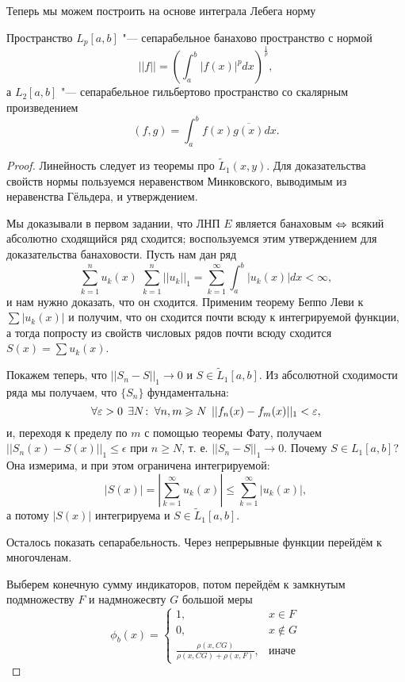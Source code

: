 \documentclass[main]{subfiles}
\begin{document}
Теперь мы можем построить на основе интеграла Лебега
норму 

\begin{theorem} %
  Пространство $L_p[a, b]$ "--- сепарабельное
  банахово пространство с нормой
  \[
    ||f|| = \left( \int_a^b |f(x)|^p d x \right)^{\frac1p},
  \]
  а $L_2[a, b]$ "--- сепарабельное гильбертово пространство
  со скалярным произведением
  \[
    (f, g) = \int_a^b f(x) \overline{g(x)} dx.
  \]
\end{theorem}
\begin{proof}
  Линейность следует из теоремы про $\widetilde{L}_1(x, y)$.
  Для доказательства свойств нормы
  пользуемся неравенством Минковского, выводимым из
  неравенства Гёльдера, и утверждением.

  Мы доказывали в первом задании, что ЛНП $E$
  является банаховым $\Leftrightarrow$ всякий абсолютно
  сходящийся ряд сходится; воспользуемся
  этим утверждением для доказательства
  банаховости. Пусть нам дан ряд
  \[
    \sum_{k = 1}^n u_k(x) \;
    \sum_{k = 1}^n ||u_k||_1 =
    \sum_{k = 1}^\infty \int_a^b |u_k(x)| dx
    < \infty,
  \]
  и нам нужно доказать, что он сходится.
  Применим теорему Беппо Леви к $\sum |u_k(x)|$
  и получим, что он сходится почти всюду к интегрируемой функции,
  а тогда попросту из свойств числовых рядов
  почти всюду сходится $S(x) = \sum u_k(x)$.

  Покажем теперь, что
  $||S_n - S||_1 \to  0$ и $S \in \widetilde{L}_1[a,b]$.
  Из абсолютной сходимости ряда мы получаем, что
  $\{ S_n \}$ фундаментальна:
  \[
    \forall {\varepsilon> 0} \; \, \exists N \colon \:
    \forall {n, m \geqslant N} \; \, ||f_n(x) - f_m(x)||_1 < \varepsilon,
  \]
  и, переходя к пределу по $m$ с помощью теоремы Фату,
  получаем
  $||S_n(x) - S(x)||_1 \le \epsilon$ при $n \ge N$,
  т. е. $||S_n - S||_1 \to 0$.
  Почему $S \in L_1[a, b]$? Она измерима, и при этом
  ограничена интегрируемой:
  \[
    |S(x)| = |\sum_{k = 1}^\infty u_k(x)| \le
    \sum_{k = 1}^\infty |u_k(x)|,
  \]
  а потому $|S(x)|$ интегрируема и $S \in \widetilde{L}_1[a,b]$.

  Осталось показать сепарабельность.
  Через непрерывные функции перейдём к многочленам.

  Выберем конечную сумму индикаторов,
  потом перейдём к замкнутым подмножеству
  $F$ и надмножесвту $G$
  большой меры
  \[
    \phi_b(x) = \begin{cases}
      1, & x \in F \\
      0, & x \notin G \\
      \frac{\rho(x, CG)}{\rho(x, CG) + \rho(x, F)}, & \text{иначе}
    \end{cases}
  \]
\end{proof}
\end{document}
